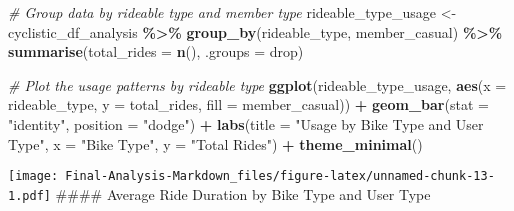 \documentclass[
]{article}
\newenvironment{Shaded}{\begin{snugshade}}{\end{snugshade}}
\newcommand{\AttributeTok}[1]{\textcolor[rgb]{0.13,0.29,0.53}{#1}}
\newcommand{\CommentTok}[1]{\textcolor[rgb]{0.56,0.35,0.01}{\textit{#1}}}
\newcommand{\FunctionTok}[1]{\textcolor[rgb]{0.13,0.29,0.53}{\textbf{#1}}}
\newcommand{\NormalTok}[1]{#1}
\newcommand{\OtherTok}[1]{\textcolor[rgb]{0.56,0.35,0.01}{#1}}
\newcommand{\SpecialCharTok}[1]{\textcolor[rgb]{0.81,0.36,0.00}{\textbf{#1}}}
\newcommand{\StringTok}[1]{\textcolor[rgb]{0.31,0.60,0.02}{#1}}
\begin{document}
\begin{Shaded}
\begin{Highlighting}[]
\CommentTok{\# Group data by rideable type and member type}
\NormalTok{rideable\_type\_usage }\OtherTok{\textless{}{-}}\NormalTok{ cyclistic\_df\_analysis }\SpecialCharTok{\%\textgreater{}\%}
  \FunctionTok{group\_by}\NormalTok{(rideable\_type, member\_casual) }\SpecialCharTok{\%\textgreater{}\%}
  \FunctionTok{summarise}\NormalTok{(}\AttributeTok{total\_rides =} \FunctionTok{n}\NormalTok{(), }\AttributeTok{.groups =} \StringTok{\textquotesingle{}drop\textquotesingle{}}\NormalTok{)}

\CommentTok{\# Plot the usage patterns by rideable type}
\FunctionTok{ggplot}\NormalTok{(rideable\_type\_usage, }\FunctionTok{aes}\NormalTok{(}\AttributeTok{x =}\NormalTok{ rideable\_type, }\AttributeTok{y =}\NormalTok{ total\_rides, }\AttributeTok{fill =}\NormalTok{ member\_casual)) }\SpecialCharTok{+}
  \FunctionTok{geom\_bar}\NormalTok{(}\AttributeTok{stat =} \StringTok{"identity"}\NormalTok{, }\AttributeTok{position =} \StringTok{"dodge"}\NormalTok{) }\SpecialCharTok{+}
  \FunctionTok{labs}\NormalTok{(}\AttributeTok{title =} \StringTok{"Usage by Bike Type and User Type"}\NormalTok{, }\AttributeTok{x =} \StringTok{"Bike Type"}\NormalTok{, }\AttributeTok{y =} \StringTok{"Total Rides"}\NormalTok{) }\SpecialCharTok{+}
  \FunctionTok{theme\_minimal}\NormalTok{()}
\end{Highlighting}
\end{Shaded}

\texttt{[image: Final-Analysis-Markdown\_files/figure-latex/unnamed-chunk-13-1.pdf]}
\#\#\#\# Average Ride Duration by Bike Type and User Type
\end{document}
